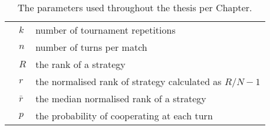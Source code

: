 \begin{table}[h]
{\begin{tabular}{lll}
\rowcolor{Gray}
    & \(k\) & number of tournament repetitions \\
\rowcolor{Gray}
    & \(n\) & number of turns per match \\
\rowcolor{Gray}
    & \(R\) & the rank of a strategy \\
\rowcolor{Gray}
    & \(r\) & the normalised rank of strategy calculated as \(R / N - 1\)\\
\rowcolor{Gray}
    & \(\bar{r}\) & the median normalised rank of a strategy \\
\rowcolor{Gray}
    & \(p\) & the probability of cooperating at each turn \\
\bottomrule
    \end{tabular}}
    \caption{The parameters used throughout the thesis per Chapter.}\label{table:overall_parameters}
\end{table}